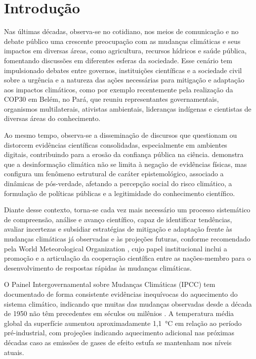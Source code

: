 \chapter{Introdução}
\label{intro}

Nas últimas décadas, observa-se no cotidiano, nos meios de comunicação e no debate público uma crescente preocupação com as mudanças climáticas e seus impactos em diversas áreas, como agricultura, recursos hídricos e saúde pública, fomentando discussões em diferentes esferas da sociedade. Esse cenário tem impulsionado debates entre governos, instituições científicas e a sociedade civil sobre a urgência e a natureza das ações necessárias para mitigação e adaptação aos impactos climáticos, como por exemplo recentemente pela realização da COP30 em Belém, no Pará, que reuniu representantes governamentais, organismos multilaterais, ativistas ambientais, lideranças indígenas e cientistas de diversas áreas do conhecimento.

Ao mesmo tempo, observa-se a disseminação de discursos que questionam ou distorcem evidências científicas consolidadas, especialmente em ambientes digitais, contribuindo para a erosão da confiança pública na ciência. \cite{essien2025} demonstra que a desinformação climática não se limita à negação de evidências físicas, mas configura um fenômeno estrutural de caráter epistemológico, associado a dinâmicas de pós-verdade, afetando a percepção social do risco climático, a formulação de políticas públicas e a legitimidade do conhecimento científico.

Diante desse contexto, torna-se cada vez mais necessário um processo sistemático de compreensão, análise e avanço científico, capaz de identificar tendências, avaliar incertezas e subsidiar estratégias de mitigação e adaptação frente às mudanças climáticas já observadas e às projeções futuras, conforme recomendado pela World Meteorological Organization \citep{wmo2025}, cujo papel institucional inclui a promoção e a articulação da cooperação científica entre as nações-membro para o desenvolvimento de respostas rápidas às mudanças climáticas.

O Painel Intergovernamental sobre Mudanças Climáticas (IPCC) tem documentado de forma consistente evidências inequívocas do aquecimento do sistema climático, indicando que muitas das mudanças observadas desde a década de 1950 não têm precedentes em séculos ou milênios \citep{ipcc2021}. A temperatura média global da superfície aumentou aproximadamente 1,1~°C em relação ao período pré-industrial, com projeções indicando aquecimento adicional nas próximas décadas caso as emissões de gases de efeito estufa se mantenham nos níveis atuais.

